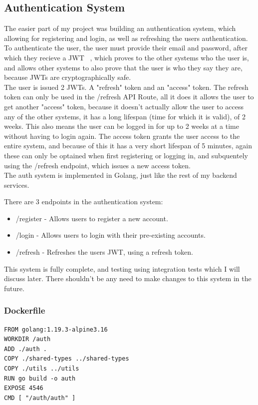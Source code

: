\documentclass[titlepage]{article}
\begin{document}
\subsection{Authentication System}
The easier part of my project was building an authentication system, which allowing for registering and login, as well as refreshing the users authentication. To authenticate the user, the user must provide their email and password, after which they recieve a JWT ~\cite{jwt}, which proves to the other systems who the user is, and allows other systems to also prove that the user is who they say they are, because JWTs are cryptographically safe. \\

The user is issued 2 JWTs. A "refresh" token and an "access" token. The refresh token can only be used in the /refresh API Route, all it does it allows the user to get another "access" token, because it doesn't actually allow the user to access any of the other systems, it has a long lifespan (time for which it is valid), of 2 weeks. This also means the user can be logged in for up to 2 weeks at a time without having to login again. The access token grants the user access to the entire system, and because of this it has a very short lifespan of 5 minutes, again these can only be optained when first registering or logging in, and subquentely using the /refresh endpoint, which issues a new access token. \\

The auth system is implemented in Golang, just like the rest of my backend services.

There are 3 endpoints in the authentication system:
\begin{itemize}
  \item /register - Allows users to register a new account.
  \item /login - Allows users to login with their pre-existing accounts.
  \item /refresh - Refreshes the users JWT, using a refresh token.
\end{itemize}

This system is fully complete, and testing using integration tests which I will discuss later. There shouldn't be any need to make changes to this system in the future.

\subsubsection{Dockerfile}
\begin{verbatim}
FROM golang:1.19.3-alpine3.16
WORKDIR /auth
ADD ./auth .
COPY ./shared-types ../shared-types
COPY ./utils ../utils
RUN go build -o auth
EXPOSE 4546
CMD [ "/auth/auth" ]
\end{verbatim}
\end{document}
